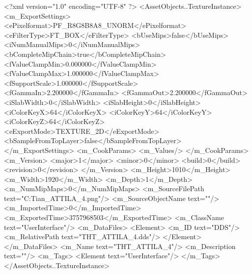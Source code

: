 <?xml version="1.0" encoding="UTF-8" ?>
<AssetObjects..TextureInstance>
	<m_ExportSettings>
		<ePixelformat>PF_R8G8B8A8_UNORM</ePixelformat>
		<eFilterType>FT_BOX</eFilterType>
		<bUseMips>false</bUseMips>
		<iNumManualMips>0</iNumManualMips>
		<bCompleteMipChain>true</bCompleteMipChain>
		<fValueClampMin>0.000000</fValueClampMin>
		<fValueClampMax>1.000000</fValueClampMax>
		<fSupportScale>1.000000</fSupportScale>
		<fGammaIn>2.200000</fGammaIn>
		<fGammaOut>2.200000</fGammaOut>
		<iSlabWidth>0</iSlabWidth>
		<iSlabHeight>0</iSlabHeight>
		<iColorKeyX>64</iColorKeyX>
		<iColorKeyY>64</iColorKeyY>
		<iColorKeyZ>64</iColorKeyZ>
		<eExportMode>TEXTURE_2D</eExportMode>
		<bSampleFromTopLayer>false</bSampleFromTopLayer>
	</m_ExportSettings>
	<m_CookParams>
		<m_Values/>
	</m_CookParams>
	<m_Version>
		<major>1</major>
		<minor>0</minor>
		<build>0</build>
		<revision>0</revision>
	</m_Version>
	<m_Height>1010</m_Height>
	<m_Width>1920</m_Width>
	<m_Depth>1</m_Depth>
	<m_NumMipMaps>0</m_NumMipMaps>
	<m_SourceFilePath text="C:\Users\Troy Tian\Downloads\THT_ATTILA_4.png"/>
	<m_SourceObjectName text=""/>
	<m_ImportedTime>0</m_ImportedTime>
	<m_ExportedTime>3757968503</m_ExportedTime>
	<m_ClassName text="UserInterface"/>
	<m_DataFiles>
		<Element>
			<m_ID text="DDS"/>
			<m_RelativePath text="THT_ATTILA_4.dds"/>
		</Element>
	</m_DataFiles>
	<m_Name text="THT_ATTILA_4"/>
	<m_Description text=""/>
	<m_Tags>
		<Element text="UserInterface"/>
	</m_Tags>
</AssetObjects..TextureInstance>

